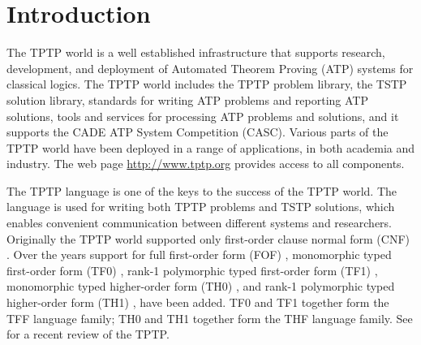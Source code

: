 \documentclass{easychair}
\begin{document}
\renewcommand{\implies}{\Rightarrow}
\newcommand{\liff}{\Leftrightarrow}
\newcommand{\lniff}{\not\Leftrightarrow}
\newcommand{\bool}{\mathit{bool}}

\section{Introduction}
\label{Introduction}

The TPTP world \cite{Sut10} is a well established infrastructure that supports
research, development, and deployment of Automated Theorem Proving (ATP)
systems for classical logics.
The TPTP world includes the TPTP problem library,
the TSTP solution library,
standards for writing ATP problems and reporting ATP solutions,
tools and services for processing ATP problems and solutions,
and it supports the CADE ATP System Competition (CASC).
Various parts of the TPTP world have been deployed in a range of applications,
in both academia and industry.
The web page \url{http://www.tptp.org} provides access to all components.

The TPTP language is one of the keys to the success of the TPTP world.
The language is used for writing both TPTP problems and TSTP solutions,
which enables convenient communication between different systems and
researchers.
Originally the TPTP world supported only first-order clause normal form (CNF)
\cite{SS98-JAR}.
Over the years support for full first-order form (FOF) \cite{Sut09},
monomorphic typed first-order form (TF0) \cite{SS+12}, rank-1 polymorphic
typed first-order form (TF1) \cite{BP13-TFF1}, monomorphic typed higher-order 
form (TH0) \cite{SB10}, and rank-1 polymorphic typed higher-order form (TH1) 
\cite{KSR16}, have been added.
TF0 and TF1 together form the TFF language family; TH0 and TH1 together form 
the THF language family.
See \cite{Sut17} for a recent review of the TPTP.
\end{document}
